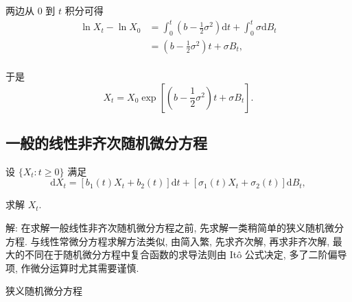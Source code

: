 \documentclass[openany]{ctexbook}
\theoremstyle{kaiti}
\theoremstyle{normal}
\begin{document}
两边从 $0$ 到 $t$ 积分可得
\begin{equation}
  \begin{aligned}
    \ln X_t-\ln X_0
    &=\int_{0}^t\left(b-\frac{1}{2}\sigma^2\right)\mathrm{d}t+\int_{0}^t\sigma\mathrm{d}B_t\\
    &=\left(b-\frac{1}{2}\sigma^2\right)t+\sigma B_t,\\
  \end{aligned}
\end{equation}

于是
\begin{equation}
  X_t=X_0\exp\left[\left(b-\frac{1}{2}\sigma^2\right)t+\sigma B_t\right].
\end{equation}

\subsection{一般的线性非齐次随机微分方程}

设 $\{X_t:t\geqslant0\}$ 满足
\begin{equation}
  \mathrm{d}X_t=[b_1(t) X_t+b_2(t)]\mathrm{d}t+[\sigma_1(t) X_t+\sigma_2(t)]\mathrm{d}B_t,
\end{equation}

求解 $X_t$.

解: 在求解一般线性非齐次随机微分方程之前, 先求解一类稍简单的狭义随机微分方程. 与线性常微分方程求解方法类似, 由简入繁, 先求齐次解, 再求非齐次解, 最大的不同在于随机微分方程中复合函数的求导法则由 It\^o 公式决定, 多了二阶偏导项, 作微分运算时尤其需要谨慎.

狭义随机微分方程
\end{document}
